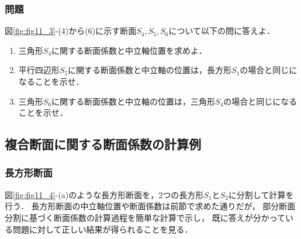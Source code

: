 \documentclass[10pt,a4j]{jarticle}
\begin{document}
\subsubsection{問題}
図\ref{fig:fig11_3}-(4)から(6)に示す断面$S_4,S_5,S_6$について以下の問に答えよ．
\begin{enumerate}
\item
三角形$S_4$に関する断面係数と中立軸位置を求めよ．
\item
平行四辺形$S_5$に関する断面係数と中立軸の位置は，長方形$S_1$の場合と同じになることを示せ．
\item
三角形$S_6$に関する断面係数と中立軸の位置は，三角形$S_4$の場合と同じになることを示せ．
\end{enumerate}
\subsection{複合断面に関する断面係数の計算例}
\subsubsection{長方形断面}
図\ref{fig:fig11_4}-(a)のような長方形断面を，2つの長方形$S_1$と$S_2$に分割して計算を行う．
長方形断面の中立軸位置や断面係数は前節で求めた通りだが，
部分断面分割に基づく断面係数の計算過程を簡単な計算で示し，
既に答えが分かっている問題に対して正しい結果が得られることを見る．
\end{document}

